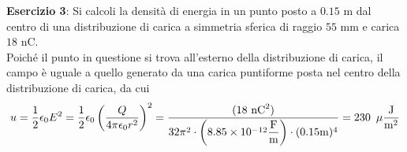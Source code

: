 \documentclass[a4paper]{extarticle}
\begin{document}
\vspace{2em}
\noindent
\textbf{Esercizio 3}: Si calcoli la densità di energia in un punto posto a $0.15$ m dal centro di una distribuzione di carica a simmetria sferica di raggio $55$ mm e carica $18$ nC.\\
Poiché il punto in questione si trova all'esterno della distribuzione di carica, il campo è uguale a quello generato da una carica puntiforme posta nel centro della distribuzione di carica, da cui
\[u=\frac{1}{2}\epsilon_0E^2=\frac{1}{2}\epsilon_0\left(\frac{Q}{4 \pi \epsilon_0 r^2}\right)^2 = \frac{(18 \text{ nC}^2)}{32 \pi^2 \cdot \left(8.85 \times 10^{-12} \dfrac{\text{F}}{\text{m}}\right) \cdot (0.15 \text{m})^4} = 230 \hspace{0.5em}\mu\frac{\text{J}}{\text{m}^2}\]
\end{document}
